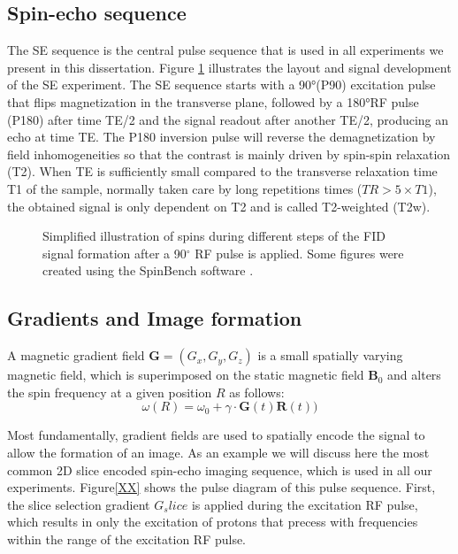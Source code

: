 \subsection*{Spin-echo sequence}
The {\gls{SE}} sequence is the central pulse sequence that is used in all experiments we present in this dissertation. Figure \ref{fig:chap2 SE sequence} illustrates the layout and signal development of the \gls{SE} experiment. The \gls{SE} sequence starts with a 90°(P90) excitation pulse that flips magnetization in the transverse plane, followed by a 180°RF pulse (P180) after time TE/2 and the signal readout after another TE/2, producing an echo at time TE. The P180 inversion pulse will reverse the demagnetization by field inhomogeneities so that the contrast is mainly driven by spin-spin relaxation (T2). When TE is sufficiently small compared to the transverse relaxation time T1 of the sample, normally taken care by long repetitions times ($TR>5\times T1 $), the obtained signal is only dependent on T2 and is called T2-weighted (T2w). 

\begin{figure}[ht]
\centering
{}
\caption{Simplified illustration of spins during different steps of the FID signal formation after a 90$^\circ$ RF pulse is applied. Some figures were created using the SpinBench software \citep{Overall:2007}.}
\label{fig:chap2 SE sequence}
\end{figure}


\subsection*{Gradients and Image formation}
A magnetic gradient field $\textbf{G}=(G_{x},G_{y},G_{z})$ is a small spatially varying magnetic field, which is superimposed on the static magnetic field $\textbf{B}_{0}$ and alters the spin frequency at a given position $R$ as follows:
\begin{equation}
\omega(R)= \omega_0 + \gamma \cdot \textbf{G}(t)\textbf{R}(t))
\end{equation}


Most fundamentally, gradient fields are used to spatially encode the signal to allow the formation of an image. As an example we will discuss here the most common 2D slice encoded spin-echo imaging sequence, which is used in all our experiments. Figure\ref{XX} shows the pulse diagram of this pulse sequence. First, the slice selection gradient $G_slice$ is applied during the excitation RF pulse, which results in only the excitation of protons that precess with frequencies within the range of the excitation RF pulse. 

